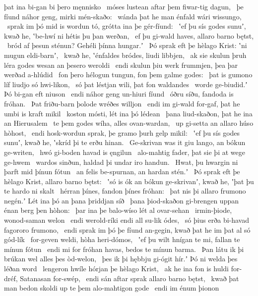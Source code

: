 þat ina bi-gan bi þero męnnisko \hld\ móses lustean
aftar þem fiwar-tig dagun, \hld\ þe fíund náhor geng,
mirki mén-skaðo: \hld\ wánda þat he man énfald
wári wissungo, \hld\ sprak im þó mid is wordun tó,
grótta ina þe gér-fíund: \hld\ ʽef þu sís godes sunuʼ, kwað he,
ʽbe-hwí ni hétis þu þan werðan, \hld\ ef þu gi-wald haves,
allaro barno bętst, \hld\ bród af þesun sténun?
Gehéli þínna hungar.ʼ \hld\ Þó sprak eft þe hèlago Krist:
ʽni mugun eldi-barnʼ, \hld\ kwað he, ʽénfaldes bródes,
liudi libbjen, \hld\ ak sie skulun þruh léra godes %
wesan an þesero weroldi \hld\ endi skulun þiu werk frummjen,
þea þar werðad a-hlúdid \hld\ fon þero hélogun tungun,
fon þem galme godes: \hld\ þat is gumono líf
liudjo só hwi-likon, \hld\ só þat léstjan wili,
þat fon waldandes \hld\ worde ge-biudid.ʼ
Þó bi-gan eft niuson \hld\ endi náhor geng
un-hiuri fíund \hld\ óðru síðu,
fandoda is fróhan. \hld\ Þat friðu-barn þolode
wréðes willjon \hld\ endi im gi-wald for-gaf,
þat he umbi is kraft mikil \hld\ koston mósti,
lét ina þó lédean \hld\ þana liud-skaðon,
þat he ina an Hierusalem \hld\ te þem godes wíha,
alles ovan-wardan, \hld\ up gi-setta
an allaro húso hòhost, \hld\ endi hosk-wordun sprak,
þe gramo þurh gelp mikil: \hld\ ʽef þu sís godes sunuʼ, kwað he,
ʽskríd þi te erðu hinan. \hld\ Ge-skrivan was it giu lango,
an bókun ge-writen, \hld\ hwó gi-boden havad
is ęngilun \hld\ alo-mahtig fader,
þat sie þi at wege ge-hwem \hld\ wardos sinðun,
haldad þi undar iro handun. \hld\ Hwat, þu hwargin ni þarft
mid þínun fótun \hld\ an felis be-spurnan,
an hardan stén.ʼ \hld\ Þó sprak eft þe hèlago Krist,
allaro barno bętst: \hld\ ʽsó is ók an bókun ge-skrivanʼ, kwað he,
ʽþat þu te hardo ni skalt \hld\ hérran þínes,
fandon þínes fróhan: \hld\ þat nis þi allaro frumono negén.ʼ
Lét ina þó an þana þriddjan síð \hld\ þana þiod-skaðon
gi-brengen uppan énan berg þen hòhon: \hld\ þar ina þe balo-wíso
lét al ovar-sehan \hld\ irmin-þiode,
wonod-saman welon \hld\ endi werold-ríki
endi all su-lik ódes, \hld\ só þius erða bi-havad
fagororo frumono, \hld\ endi sprak im þó þe fíund an-gegin,
kwað þat he im þat al só gód-lík \hld\ for-geven weldi,
hòha heri-dómos, \hld\ ʽef þu wilt hnígan te mi,
fallan te mínun fótun \hld\ endi mi for fróhan havas,
bedos te mínun barma. \hld\ Þan látu ik þi brúkan wel
alles þes òd-welon, \hld\ þes ik þi hębbju gi-ógit hír.ʼ
Þó ni welda þes léðan word \hld\ lengeron hwíle
hórjan þe hèlago Krist, \hld\ ak he ina fon is huldi for-dréf,
Satanasan for-swép, \hld\ endi sán aftar sprak
allaro barno bętst, \hld\ kwað þat man bedon skoldi
up te þem alo-mahtigon gode \hld\ endi im énum þionon
